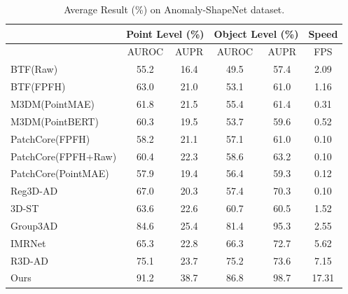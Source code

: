 \begin{table}[ht]
\centering
\caption{Average Result (\%) on Anomaly-ShapeNet dataset.}
\label{tab:ShapeNet}
\begin{tabular}{l|cc|cc|c}
\hline
& \multicolumn{2}{c|}{Point Level (\%)} & \multicolumn{2}{c|}{Object Level (\%)} & Speed \\
\hline
& AUROC & AUPR & AUROC & AUPR & FPS \\ 
\hline
BTF(Raw)                            & 55.2 & 16.4  & 49.5 & 57.4  & 2.09 \\ 
BTF(FPFH)                           & 63.0 & 21.0  & 53.1 & 61.0  & 1.16 \\ 
M3DM(PointMAE)                      & 61.8 & 21.5  & 55.4 & 61.4  & 0.31 \\ 
M3DM(PointBERT)                     & 60.3 & 19.5  & 53.7 & 59.6  & 0.52 \\ 
PatchCore(FPFH)                     & 58.2 & 21.1  & 57.1 & 61.0  & 0.10 \\ 
PatchCore(FPFH+Raw)                 & 60.4 & 22.3  & 58.6 & 63.2  & 0.10 \\ 
PatchCore(PointMAE)                 & 57.9 & 19.4  & 56.4 & 59.3  & 0.12 \\ 
Reg3D-AD \cite{liu2023real3d}       & 67.0 & 20.3  & 57.4 & 70.3  & 0.10 \\ 
3D-ST \cite{bergmann2023anomaly}    & 63.6 & 22.6  & 60.7 & 60.5  & 1.52 \\
Group3AD \cite{zhu2024towards}      & 84.6 & 25.4  & 81.4 & 95.3  & 2.55 \\ 
IMRNet \cite{li2024towards}         & 65.3 & 22.8  & 66.3 & 72.7  & 5.62 \\
R3D-AD \cite{zhou2024r3d}           & 75.1 & 23.7  & 75.2 & 73.6  & 7.15 \\
Ours                                & 91.2 & 38.7  & 86.8 & 98.7  & 17.31 \\
\hline
\end{tabular}
\end{table}

